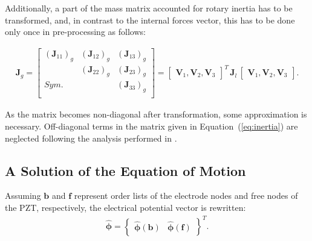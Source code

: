 \documentclass[sensors,article,accept,moreauthors,pdftex]{Definitions/mdpi}
\begin{document}
\begin{paracol}{2}
Additionally, a part of the mass matrix accounted for rotary inertia has to be transformed, and, in contrast to the internal forces vector, this has to be done only once in pre-processing as follows:

\begin{eqnarray}
\textbf{J}_g=\left [ 
\begin{array}{ccc}
	\left (\textbf{J}_{11}\right )_g & \left (\textbf{J}_{12}\right )_g & \left (\textbf{J}_{13}\right )_g\\
	 & \left (\textbf{J}_{22}\right )_g & \left (\textbf{J}_{23}\right )_g\\
	Sym. &  & \left (\textbf{J}_{33}\right )_g\\
\end{array}
\right ]
=\left[\begin{array}{ccc}
	\textbf{V}_1, \textbf{V}_2, \textbf{V}_3 \end{array}\right ]^T
\,\textbf{J}_l\,
\left[\begin{array}{ccc}
	\textbf{V}_1, \textbf{V}_2, \textbf{V}_3 \end{array}\right ].
\label{eq:inertia}
\end{eqnarray}

As the matrix becomes non-diagonal after transformation, some approximation is necessary.
Off-diagonal terms in the matrix given in Equation~(\ref{eq:inertia}) are neglected following the analysis performed in \cite{surana1980transition}.

\subsection{A Solution of the Equation of Motion}
\label{sec:time_integration}
Assuming \(\textbf{b}\) and \(\textbf{f}\) represent order lists of the electrode nodes and free nodes of the PZT, respectively, the electrical potential vector is rewritten:
\begin{eqnarray}
\widehat{\boldsymbol{\phi}} = \left \{\begin{array}{cc}
\widehat{\boldsymbol{\phi}}(\textbf{b}) &
\widehat{\boldsymbol{\phi}}(\textbf{f})
\end{array}\right \}^T.
\label{eq:potential}
\end{eqnarray}


\end{paracol}
\end{document}
